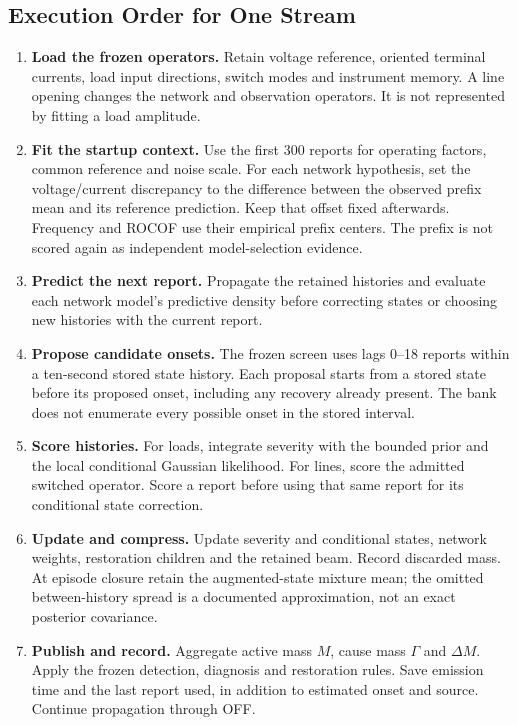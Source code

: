 \subsection{Execution Order for One Stream}

\begin{enumerate}
\item \textbf{Load the frozen operators.} Retain voltage reference,
oriented terminal currents, load input directions, switch modes and
instrument memory. A line opening changes the network and observation
operators. It is not represented by fitting a load amplitude.
\item \textbf{Fit the startup context.} Use the first 300 reports for
operating factors, common reference and noise scale. For each network
hypothesis, set the voltage/current discrepancy to the difference between
the observed prefix mean and its reference prediction. Keep that offset
fixed afterwards. Frequency and ROCOF use their empirical prefix centers.
The prefix is not scored again as independent model-selection evidence.
\item \textbf{Predict the next report.} Propagate the retained histories
and evaluate each network model's predictive density before correcting
states or choosing new histories with the current report.
\item \textbf{Propose candidate onsets.} The frozen screen uses lags
0--18 reports within a ten-second stored state history. Each proposal
starts from a stored state before its proposed onset, including any
recovery already present. The bank does not enumerate every possible
onset in the stored interval.
\item \textbf{Score histories.} For loads, integrate severity with the
bounded prior and the local conditional Gaussian likelihood. For lines,
score the admitted switched operator. Score a report before using that
same report for its conditional state correction.
\item \textbf{Update and compress.} Update severity and conditional
states, network weights, restoration children and the retained beam.
Record discarded mass. At episode closure retain the augmented-state
mixture mean; the omitted between-history spread is a documented
approximation, not an exact posterior covariance.
\item \textbf{Publish and record.} Aggregate active mass $M$, cause
mass $\Gamma$ and $\Delta M$. Apply the frozen detection, diagnosis and
restoration rules. Save emission time and the last report used, in addition
to estimated onset and source. Continue propagation through OFF.
\end{enumerate}

